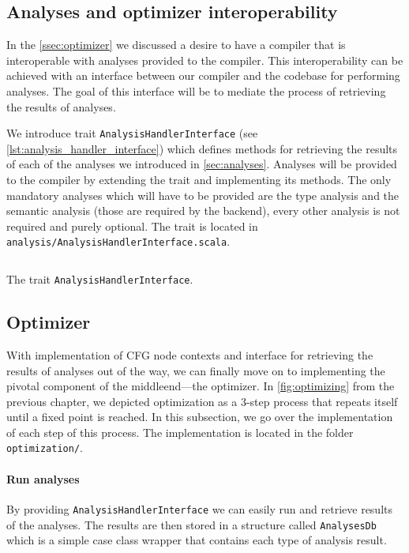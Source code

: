 \documentclass[thesis=M,english]{FITthesis}[2019/12/23]
\begin{document}
\subsection{Analyses and optimizer interoperability}\label{ssec:analyses_interop}
In the \autoref{ssec:optimizer} we discussed a desire to have a compiler that is interoperable with analyses provided to the compiler. This interoperability can be achieved with an interface between our compiler and the codebase for performing analyses. The goal of this interface will be to mediate the process of retrieving the results of analyses.

We introduce trait \texttt{AnalysisHandlerInterface} (see \autoref{lst:analysis_handler_interface}) which defines methods for retrieving the results of each of the analyses we introduced in \autoref{sec:analyses}. Analyses will be provided to the compiler by extending the trait and implementing its methods. The only mandatory analyses which will have to be provided are the type analysis and the semantic analysis (those are required by the backend), every other analysis is not required and purely optional. The trait is located in \texttt{analysis/AnalysisHandlerInterface.scala}.

\begin{listing}[H]
    \small
	\inputminted[tabsize=2,breaklines,bgcolor=codebg]{scala}{snippets/analysis_handler_interface.m}
	\caption{The trait \texttt{AnalysisHandlerInterface}.}
	\label{lst:analysis_handler_interface}
\end{listing}

\clearpage

\subsection{Optimizer}
With implementation of CFG node contexts and interface for retrieving the results of analyses out of the way, we can finally move on to implementing the pivotal component of the middleend---the optimizer. In \autoref{fig:optimizing} from the previous chapter, we depicted optimization as a 3-step process that repeats itself until a fixed point is reached. In this subsection, we go over the implementation of each step of this process. The implementation is located in the folder \texttt{optimization/}.

\paragraph*{Run analyses} By providing \texttt{AnalysisHandlerInterface} we can easily run and retrieve results of the analyses. The results are then stored in a structure called \texttt{AnalysesDb} which is a simple case class wrapper that contains each type of analysis result.
\end{document}
